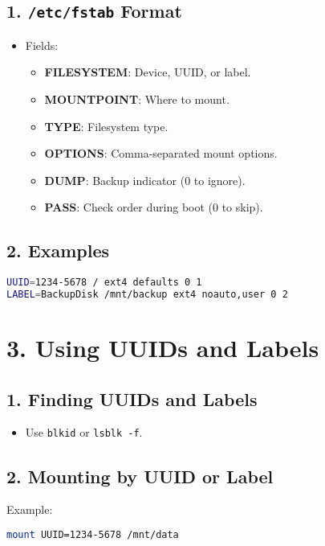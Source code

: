 \documentclass[a4paper]{report}
\begin{document}
\subsection*{1. \texttt{/etc/fstab} Format}
\begin{itemize}
    \item Fields:
    \begin{itemize}
        \item \textbf{FILESYSTEM}: Device, UUID, or label.
        \item \textbf{MOUNTPOINT}: Where to mount.
        \item \textbf{TYPE}: Filesystem type.
        \item \textbf{OPTIONS}: Comma-separated mount options.
        \item \textbf{DUMP}: Backup indicator (0 to ignore).
        \item \textbf{PASS}: Check order during boot (0 to skip).
    \end{itemize}
\end{itemize}

\subsection*{2. Examples}
\begin{lstlisting}[language=bash]
UUID=1234-5678 / ext4 defaults 0 1
LABEL=BackupDisk /mnt/backup ext4 noauto,user 0 2
\end{lstlisting}

\section*{3. Using UUIDs and Labels}

\subsection*{1. Finding UUIDs and Labels}
\begin{itemize}
    \item Use \texttt{blkid} or \texttt{lsblk -f}.
\end{itemize}

\subsection*{2. Mounting by UUID or Label}
Example:
\begin{lstlisting}[language=bash]
mount UUID=1234-5678 /mnt/data
\end{lstlisting}
\end{document}
